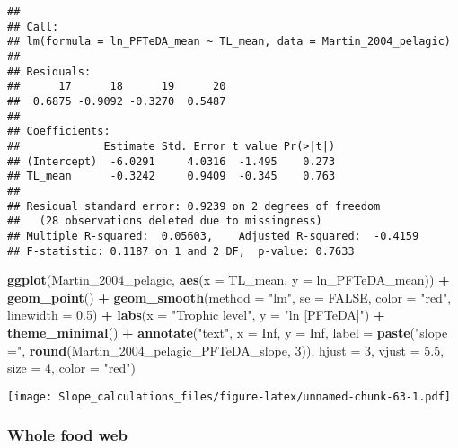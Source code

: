 \documentclass[
]{article}
\newenvironment{Shaded}{\begin{snugshade}}{\end{snugshade}}
\newcommand{\AttributeTok}[1]{\textcolor[rgb]{0.13,0.29,0.53}{#1}}
\newcommand{\ConstantTok}[1]{\textcolor[rgb]{0.56,0.35,0.01}{#1}}
\newcommand{\DecValTok}[1]{\textcolor[rgb]{0.00,0.00,0.81}{#1}}
\newcommand{\FloatTok}[1]{\textcolor[rgb]{0.00,0.00,0.81}{#1}}
\newcommand{\FunctionTok}[1]{\textcolor[rgb]{0.13,0.29,0.53}{\textbf{#1}}}
\newcommand{\NormalTok}[1]{#1}
\newcommand{\SpecialCharTok}[1]{\textcolor[rgb]{0.81,0.36,0.00}{\textbf{#1}}}
\newcommand{\StringTok}[1]{\textcolor[rgb]{0.31,0.60,0.02}{#1}}
\begin{document}
\begin{verbatim}
## 
## Call:
## lm(formula = ln_PFTeDA_mean ~ TL_mean, data = Martin_2004_pelagic)
## 
## Residuals:
##      17      18      19      20 
##  0.6875 -0.9092 -0.3270  0.5487 
## 
## Coefficients:
##             Estimate Std. Error t value Pr(>|t|)
## (Intercept)  -6.0291     4.0316  -1.495    0.273
## TL_mean      -0.3242     0.9409  -0.345    0.763
## 
## Residual standard error: 0.9239 on 2 degrees of freedom
##   (28 observations deleted due to missingness)
## Multiple R-squared:  0.05603,    Adjusted R-squared:  -0.4159 
## F-statistic: 0.1187 on 1 and 2 DF,  p-value: 0.7633
\end{verbatim}

\begin{Shaded}
\begin{Highlighting}[]
\FunctionTok{ggplot}\NormalTok{(Martin\_2004\_pelagic, }\FunctionTok{aes}\NormalTok{(}\AttributeTok{x =}\NormalTok{ TL\_mean, }\AttributeTok{y =}\NormalTok{ ln\_PFTeDA\_mean)) }\SpecialCharTok{+}
  \FunctionTok{geom\_point}\NormalTok{() }\SpecialCharTok{+}
  \FunctionTok{geom\_smooth}\NormalTok{(}\AttributeTok{method =} \StringTok{"lm"}\NormalTok{, }\AttributeTok{se =} \ConstantTok{FALSE}\NormalTok{, }\AttributeTok{color =} \StringTok{"red"}\NormalTok{, }\AttributeTok{linewidth =} \FloatTok{0.5}\NormalTok{) }\SpecialCharTok{+}
  \FunctionTok{labs}\NormalTok{(}\AttributeTok{x =} \StringTok{"Trophic level"}\NormalTok{,}
       \AttributeTok{y =} \StringTok{"ln [PFTeDA]"}\NormalTok{) }\SpecialCharTok{+}
  \FunctionTok{theme\_minimal}\NormalTok{() }\SpecialCharTok{+}
  \FunctionTok{annotate}\NormalTok{(}\StringTok{"text"}\NormalTok{, }\AttributeTok{x =} \ConstantTok{Inf}\NormalTok{, }\AttributeTok{y =} \ConstantTok{Inf}\NormalTok{, }\AttributeTok{label =} \FunctionTok{paste}\NormalTok{(}\StringTok{"slope ="}\NormalTok{, }\FunctionTok{round}\NormalTok{(Martin\_2004\_pelagic\_PFTeDA\_slope, }\DecValTok{3}\NormalTok{)), }
           \AttributeTok{hjust =} \DecValTok{3}\NormalTok{, }\AttributeTok{vjust =} \FloatTok{5.5}\NormalTok{, }\AttributeTok{size =} \DecValTok{4}\NormalTok{, }\AttributeTok{color =} \StringTok{"red"}\NormalTok{)}
\end{Highlighting}
\end{Shaded}

\texttt{[image: Slope\_calculations\_files/figure-latex/unnamed-chunk-63-1.pdf]}

\subsubsection{Whole food web}\label{whole-food-web}
\end{document}
